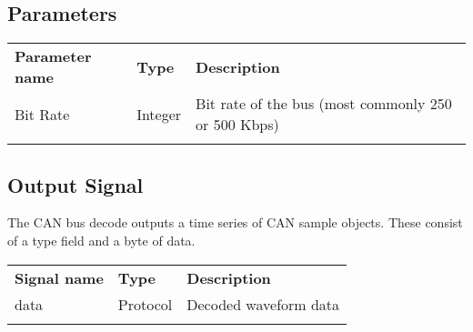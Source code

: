 \subsection{Parameters}

\begin{tabularx}{16cm}{llX}
\thickhline
\textbf{Parameter name} & \textbf{Type} & \textbf{Description} \\
\thickhline
Bit Rate & Integer & Bit rate of the bus (most commonly 250 or 500 Kbps)\\
\thickhline
\end{tabularx}

\subsection{Output Signal}

The CAN bus decode outputs a time series of CAN sample objects. These consist of a type field and a byte of data.

\begin{tabularx}{16cm}{llX}
\thickhline
\textbf{Signal name} & \textbf{Type} & \textbf{Description} \\
\thickhline
data & Protocol & Decoded waveform data \\
\thickhline
\end{tabularx}

